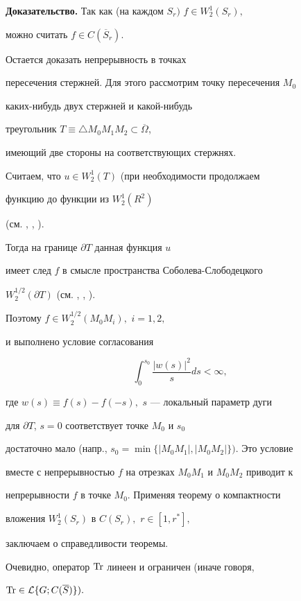 {\bf Доказательство.} Так как (на каждом $S_r)$ $f\in W_2^1(S_r),$


можно считать $f\in C(\overline S_r).$


 Остается доказать непрерывность в точках


пересечения стержней. Для этого рассмотрим точку пересечения $M_0$


каких-нибудь двух стержней и какой-нибудь


треугольник $T\equiv \triangle M_0M_1M_2\subset \overline \Omega$,


 имеющий две стороны на соответствующих стержнях.


Считаем, что $u\in W_2^1(T)$ (при необходимости продолжаем


функцию до функции из $W_2^1(R^2)$


(см. \cite{Bes}, \cite{Dy2}, \cite{Mi}).


Тогда на границе $\partial T$ данная функция $u$


имеет след $f$ в смысле простран\-ства Соболева-Слободецкого


$W_2^{1/2}(\partial T)$ (см. \cite{Bes}, \cite{Dy2}, \cite{Yak}).


Поэтому $f\in W_2^{1/2}(M_0M_i),$ $i=1,2,$


и выполнено условие согласования


$$


\int_{0}^{s_0}\frac{|w(s)|^2}{s}ds<\infty,


$$


где $ w(s)\equiv f(s)-f(-s),$ $s$ --- локальный параметр дуги


для $\partial T$, $s=0$ соответствует точке $M_0$ и $s_0$


достаточно мало (напр., $s_0=\min\{|M_0M_1|,|M_0M_2|\}).$ Это условие


вместе с непрерывностью $f$ на отрезках $M_0M_1$ и $M_0M_2$ приводит к


непрерывности $f$ в точке $M_0$. Применяя теорему о компактности


вложения $W_2^1(S_r)$ в $C(S_r),$ $r\in[1,{r^*}],$


заключаем о справедливости теоремы.





Очевидно, оператор $\operatorname{Tr}$ линеен и ограничен (иначе говоря,


$\operatorname{Tr}\in{\cal L}\{G;C(\overline S)\}).$





